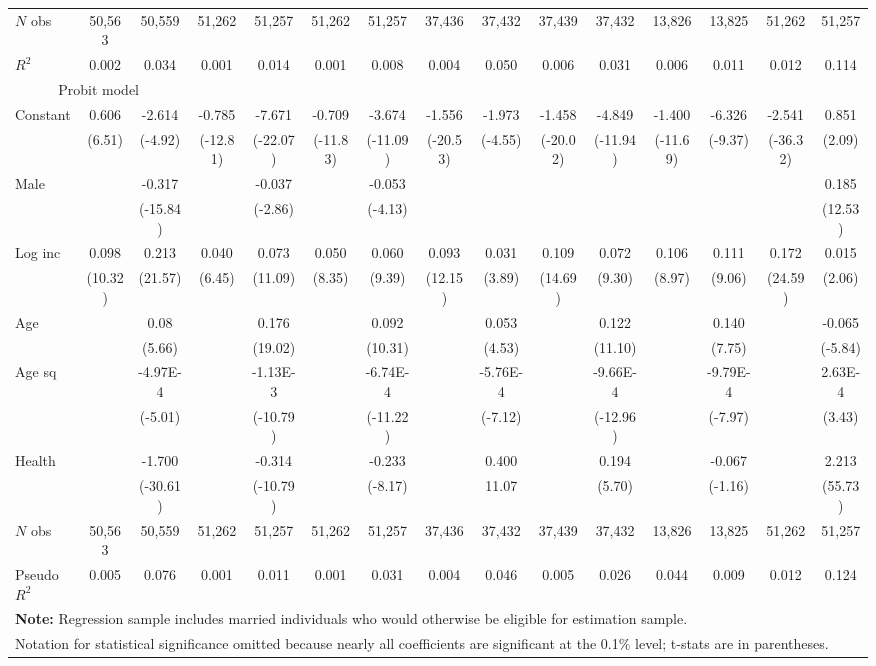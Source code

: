 \documentclass[12pt,pdftex,letterpaper]{article}
\begin{document}
\begin{table}
\begin{tabular}{l c c c c c c c c c c c c c c}
$N$ obs & 50,563 & 50,559 & 51,262 & 51,257 & 51,262 & 51,257 & 37,436 & 37,432 & 37,439 & 37,432 & 13,826 & 13,825 & 51,262 & 51,257 \\
$R^2$ & 0.002 & 0.034 & 0.001 & 0.014 & 0.001 & 0.008 & 0.004 & 0.050 & 0.006 & 0.031 & 0.006 & 0.011 & 0.012 & 0.114 \\

\hline

\multicolumn{3}{c}{Probit model} \\
Constant    & 0.606 & -2.614 & -0.785 & -7.671 & -0.709 & -3.674 & -1.556 & -1.973 & -1.458 & -4.849 & -1.400 & -6.326 & -2.541 & 0.851\\
                  & (6.51) & (-4.92) & (-12.81) & (-22.07) & (-11.83) & (-11.09) & (-20.53) & (-4.55) & (-20.02) & (-11.94) &  (-11.69) & (-9.37) &  (-36.32) & (2.09) \\
Male           & & -0.317 & & -0.037 & & -0.053 & & & & & & & & 0.185 \\
                  & & (-15.84) & & (-2.86) & & (-4.13) & & & & & & & & (12.53) \\
Log inc        & 0.098 & 0.213 & 0.040 & 0.073 & 0.050 & 0.060 & 0.093 & 0.031 & 0.109 & 0.072 & 0.106 & 0.111 & 0.172 & 0.015 \\
                   & (10.32) & (21.57) & (6.45) & (11.09) & (8.35) & (9.39) & (12.15) & (3.89) & (14.69) & (9.30) & (8.97) & (9.06) & (24.59) & (2.06) \\
Age            & & 0.08 & & 0.176 & & 0.092 & & 0.053 & & 0.122 & & 0.140 & & -0.065 \\
                   & & (5.66) & & (19.02) & & (10.31) & & (4.53) & & (11.10) & & (7.75) & & (-5.84) \\
Age sq        & & -4.97E-4 & & -1.13E-3 & & -6.74E-4 & & -5.76E-4 & & -9.66E-4 & & -9.79E-4 & & 2.63E-4 \\
                   & & (-5.01) & & (-10.79) & & (-11.22) & & (-7.12) & & (-12.96) & & (-7.97) & & (3.43) \\
Health         & & -1.700 & & -0.314 & & -0.233 & & 0.400 & & 0.194 & & -0.067 & & 2.213 \\
                   & & (-30.61) & & (-10.79) & & (-8.17) & & 11.07 & & (5.70) & & (-1.16) & & (55.73) \\

$N$ obs & 50,563 & 50,559 & 51,262 & 51,257 & 51,262 & 51,257 & 37,436 & 37,432 & 37,439 & 37,432 & 13,826 & 13,825 & 51,262 & 51,257 \\
Pseudo $R^2$ & 0.005 & 0.076 & 0.001 & 0.011 & 0.001 &  0.031 & 0.004 & 0.046 & 0.005 & 0.026 & 0.044 & 0.009 & 0.012 & 0.124 \\
\hline \hline
\multicolumn{15}{l}{\textbf{Note:} Regression sample includes married individuals who would otherwise be eligible for estimation sample.} \\
\multicolumn{15}{l}{Notation for statistical significance omitted because nearly all coefficients are significant at the 0.1\% level; t-stats are in parentheses.}
\end{tabular}
\end{table}
\end{document}
